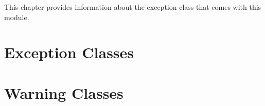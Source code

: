 
This chapter provides information about the  exception class that comes with this module.

\section{Exception Classes}

\section{Warning Classes}
